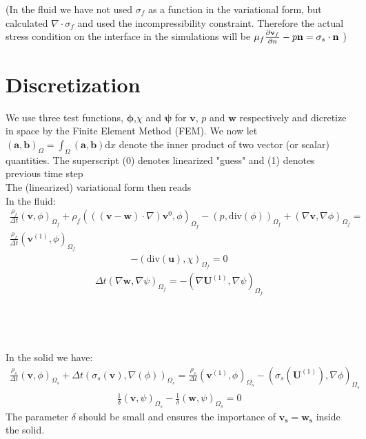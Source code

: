\documentclass{article}
\begin{document}
(In the fluid we have not used $\sigma_f$ as a function in the variational form, but calculated $\nabla \cdot \sigma_f$ and used the incompressibility constraint. Therefore the actual stress condition on the interface in the simulations will be
$ \mu_f \frac{\partial \mathbf{v}_f}{\partial n} - p\mathbf{n} = \sigma_s \cdot \mathbf{n}$ )


\section{Discretization}
We use three test functions, $\mathbf{\phi}$,$\chi$ and $\mathbf{\psi}$ for $\mathbf{v}$, $p$ and $\mathbf{w}$ respectively and dicretize in space by the Finite Element Method (FEM). We now let $(\mathbf{a},\mathbf{b})_\Omega = \int_\Omega(\mathbf{a},\mathbf{b}) \mathrm{d}x $ denote the inner product of two vector (or scalar) quantities. The superscript (0) denotes linearized "guess" and (1) denotes previous time step\\
The (linearized) variational form then reads \\
In the fluid: 
\begin{align} 
\frac{\rho_f}{\Delta t}(\mathbf{v},\phi)_{\Omega_f} + \rho_f(((\mathbf{v}-\mathbf{w})\cdot \nabla) \mathbf{v}^{0}, \phi)_{\Omega_f} - (p,\text{div}(\phi))_{\Omega_f} + (\nabla \mathbf{v}, \nabla \phi)_{\Omega_f} = & \\
\frac{\rho_f}{\Delta t}(\mathbf{v}^{(1)},\phi)_{\Omega_f}
\end{align}
\begin{align}
-(\text{div}(\mathbf{u}),\chi)_{\Omega_f} = 0
\end{align}
\begin{align}
\Delta t(\nabla \mathbf{w}, \nabla \psi)_{\Omega_f} = - (\nabla \mathbf{U}^{(1)}, \nabla \psi)_{\Omega_f}
\end{align}
\\
\\
\\
\\
In the solid we have: 
\begin{align}
\frac{\rho_s}{\Delta t}(\mathbf{v},\phi)_{\Omega_s} + \Delta t (\sigma_s (\mathbf{v}), \nabla(\phi))_{\Omega_s} = \frac{\rho_s}{\Delta t}(\mathbf{v}^{(1)},\phi)_{\Omega_s} - (\sigma_s(\mathbf{U}^{(1)}), \nabla \phi)_{\Omega_s}
\end{align}
\begin{align}
\frac{1}{\delta}(\mathbf{v},\psi)_{\Omega_s} - \frac{1}{\delta}(\mathbf{w},\psi)_{\Omega_s} = 0
\end{align}
The parameter $\delta $ should be small and ensures the importance of $\mathbf{v_s} = \mathbf{w_s}$ inside the solid. 
\\
\end{document}

